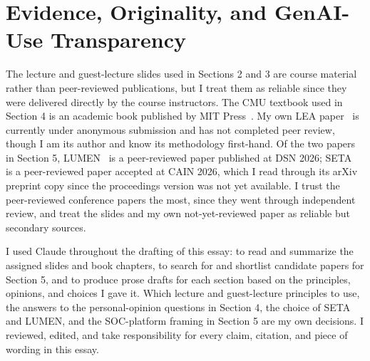 \documentclass[11pt,a4paper]{article}
\begin{document}
\section{Evidence, Originality, and GenAI-Use Transparency}

The lecture and guest-lecture slides used in Sections 2 and 3 are course material rather than peer-reviewed publications, but I treat them as reliable since they were delivered directly by the course instructors.
The CMU textbook used in Section 4 is an academic book published by MIT Press~\cite{kaestner2025}.
My own LEA paper~\cite{lea2026} is currently under anonymous submission and has not completed peer review, though I am its author and know its methodology first-hand.
Of the two papers in Section 5, LUMEN~\cite{lumen2026} is a peer-reviewed paper published at DSN 2026; SETA~\cite{seta2026} is a peer-reviewed paper accepted at CAIN 2026, which I read through its arXiv preprint copy since the proceedings version was not yet available.
I trust the peer-reviewed conference papers the most, since they went through independent review, and treat the slides and my own not-yet-reviewed paper as reliable but secondary sources.

I used Claude throughout the drafting of this essay: to read and summarize the assigned slides and book chapters, to search for and shortlist candidate papers for Section 5, and to produce prose drafts for each section based on the principles, opinions, and choices I gave it.
Which lecture and guest-lecture principles to use, the answers to the personal-opinion questions in Section 4, the choice of SETA and LUMEN, and the SOC-platform framing in Section 5 are my own decisions.
I reviewed, edited, and take responsibility for every claim, citation, and piece of wording in this essay.



\end{document}
